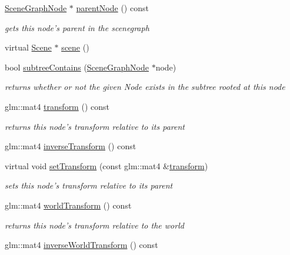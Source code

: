 \begin{DoxyCompactItemize}
\hyperlink{classmotorcar_1_1SceneGraphNode}{Scene\-Graph\-Node} $\ast$ \hyperlink{classmotorcar_1_1SceneGraphNode_a57dd5826ed6bf15c8a879f5a090c6000}{parent\-Node} () const 
\begin{DoxyCompactList}\small\item\em gets this node's parent in the scenegraph \end{DoxyCompactList}\item 
virtual \hyperlink{classmotorcar_1_1Scene}{Scene} $\ast$ \hyperlink{classmotorcar_1_1SceneGraphNode_aa14e637ed4ae98f77e28941a4b5cfdd8}{scene} ()
\item 
bool \hyperlink{classmotorcar_1_1SceneGraphNode_ac2be631270bc40cb1e070983c30a323f}{subtree\-Contains} (\hyperlink{classmotorcar_1_1SceneGraphNode}{Scene\-Graph\-Node} $\ast$node)
\begin{DoxyCompactList}\small\item\em returns whether or not the given Node exists in the subtree rooted at this node \end{DoxyCompactList}\item 
glm\-::mat4 \hyperlink{classmotorcar_1_1SceneGraphNode_ad96e79fdd739ac8223a3128003be391a}{transform} () const 
\begin{DoxyCompactList}\small\item\em returns this node's transform relative to its parent \end{DoxyCompactList}\item 
glm\-::mat4 \hyperlink{classmotorcar_1_1SceneGraphNode_af8b8174098f1de1067541f0e3ebec72e}{inverse\-Transform} () const 
\item 
virtual void \hyperlink{classmotorcar_1_1SceneGraphNode_a7cd7700336833efa89c8004e85a1fd61}{set\-Transform} (const glm\-::mat4 \&\hyperlink{classmotorcar_1_1SceneGraphNode_ad96e79fdd739ac8223a3128003be391a}{transform})
\begin{DoxyCompactList}\small\item\em sets this node's transform relative to its parent \end{DoxyCompactList}\item 
glm\-::mat4 \hyperlink{classmotorcar_1_1SceneGraphNode_a3e7fba2add3f63a65f31996f0ce9c9bf}{world\-Transform} () const 
\begin{DoxyCompactList}\small\item\em returns this node's transform relative to the world \end{DoxyCompactList}\item 
glm\-::mat4 \hyperlink{classmotorcar_1_1SceneGraphNode_a10e4fd743e891cef676435c5f5d5467d}{inverse\-World\-Transform} () const 

\end{DoxyCompactItemize}
